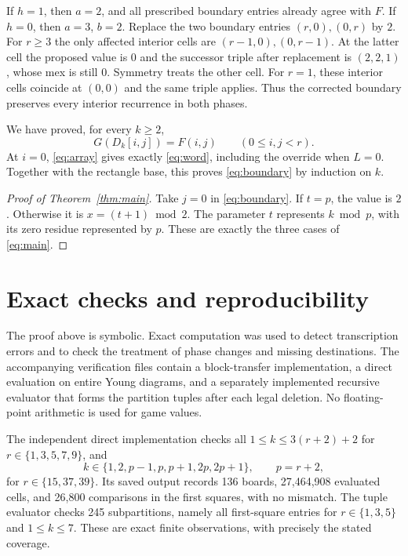 \documentclass[11pt]{article}
\theoremstyle{remark}
\begin{document}
If $h=1$, then $a=2$, and all prescribed boundary entries already
agree with $F$. If $h=0$, then $a=3$, $b=2$. Replace the two
boundary entries $(r,0),(0,r)$ by $2$. For $r\geq3$ the only affected
interior cells are $(r-1,0),(0,r-1)$. At the latter cell the proposed
value is $0$ and the successor triple after replacement is $(2,2,1)$,
whose mex is still $0$. Symmetry treats the other cell. For $r=1$,
these interior cells coincide at $(0,0)$ and the same triple applies.
Thus the corrected boundary preserves every interior recurrence in
both phases.

We have proved, for every $k\geq2$,
\begin{equation}\label{eq:interior}
 G(D_k[i,j])=F(i,j)\qquad(0\leq i,j<r).
\end{equation}
At $i=0$, \eqref{eq:array} gives exactly \eqref{eq:word}, including
the override when $L=0$. Together with the rectangle base, this proves
\eqref{eq:boundary} by induction on $k$.

\begin{proof}[Proof of Theorem~\ref{thm:main}]
Take $j=0$ in \eqref{eq:boundary}. If $t=p$, the value is $2$.
Otherwise it is $x=(t+1)\bmod2$. The parameter $t$ represents
$k\bmod p$, with its zero residue represented by $p$. These are
exactly the three cases of \eqref{eq:main}.
\end{proof}

\section{Exact checks and reproducibility}

The proof above is symbolic. Exact computation was used to detect
transcription errors and to check the treatment of phase changes and
missing destinations. The accompanying verification files contain a
block-transfer implementation, a direct evaluation on entire Young
diagrams, and a separately implemented recursive evaluator that forms
the partition tuples after each legal deletion. No floating-point
arithmetic is used for game values.

The independent direct implementation checks all
$1\leq k\leq3(r+2)+2$ for $r\in\{1,3,5,7,9\}$, and
\[
 k\in\{1,2,p-1,p,p+1,2p,2p+1\},\qquad p=r+2,
\]
for $r\in\{15,37,39\}$. Its saved output records 136 boards,
27,464,908 evaluated cells, and 26,800 comparisons in the first squares,
with no mismatch. The tuple evaluator checks 245 subpartitions, namely
all first-square entries for $r\in\{1,3,5\}$ and $1\leq k\leq7$.
These are exact finite observations, with precisely the stated coverage.
\end{document}
